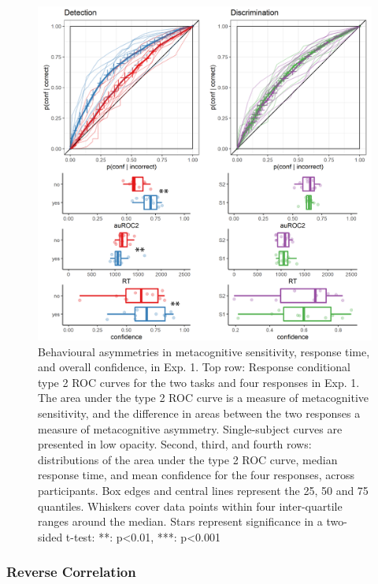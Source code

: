 \documentclass[12pt,twoside]{reedthesis}
\begin{document}
\begin{figure}
\includegraphics[width=\textwidth]{figure/RC/RC-exp1-asymmetries-enhanced} \caption[Behavioural asymmetries in metacognitive sensitivity, response time, and overall confidence, in Exp. 1]{Behavioural asymmetries in metacognitive sensitivity, response time, and overall confidence, in Exp. 1. Top row: Response conditional type 2 ROC curves for the two tasks and four responses in Exp. 1. The area under the type 2 ROC curve is a measure of metacognitive sensitivity, and the difference in areas between the two responses a measure of metacognitive asymmetry. Single-subject curves are presented in low opacity. Second, third, and fourth rows: distributions of the area under the type 2 ROC curve, median response time, and mean confidence for the four responses, across participants. Box edges and central lines represent the 25, 50 and 75 quantiles. Whiskers cover data points within four inter-quartile ranges around the median. Stars represent significance in a two-sided t-test: **: p\textless0.01, ***: p\textless0.001}\label{fig:RC-exp1-asymmetries}
\end{figure}
\hypertarget{reverse-correlation}{%
\subsubsection{Reverse Correlation}\label{reverse-correlation}}
\end{document}
